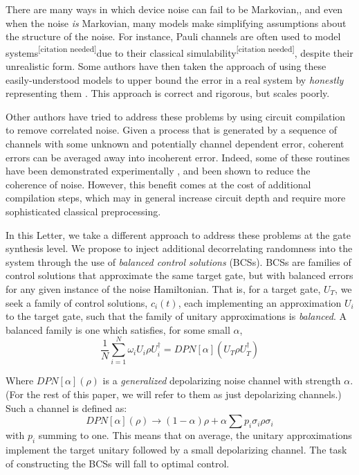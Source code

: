 \documentclass[aps,nofootinbib,pra,notitlepage,twocolumn]{revtex4-1}
\newcommand{\needcite}{{\color{blue}\textsuperscript{[citation needed]}}}
\begin{document}
There are many ways in which device noise can fail to be Markovian,\cite{Kelly2018, BlumeKohout2017}, and even when the noise \textit{is} Markovian, many models make simplifying assumptions about the structure of the noise. For instance, Pauli channels are often used to model systems\needcite due to their classical simulability\needcite, despite their unrealistic form. Some authors have then taken the approach of using these easily-understood models to upper bound the error in a real system by \textit{honestly} representing them \cite{Puzzuoli2014}. This approach is correct and rigorous, but scales poorly.

Other authors have tried to address these problems \cite{Wallman2016, Campbell2017, Heim2016} by using circuit compilation to remove correlated noise. Given a process that is generated by a sequence of channels with some unknown and potentially channel dependent error, coherent errors can be averaged away into incoherent error. Indeed, some of these routines have been demonstrated experimentally \cite{Ware2018}, and been shown to reduce the coherence of noise. However, this benefit comes at the cost of additional compilation steps, which may in general increase circuit depth and require more sophisticated classical preprocessing. 

In this Letter, we take a different approach to address these problems at the gate synthesis level. We propose to inject additional decorrelating randomness into the system through the use of \emph{balanced control solutions} (BCSs). BCSs are families of control solutions that approximate the same target gate, but with balanced errors for any given instance of the noise Hamiltonian. That is, for a target gate, $U_T$, we seek a family of control solutions, $c_i(t)$, each implementing an approximation $U_i$ to the target gate, such that the family of unitary approximations is \emph{balanced}. A balanced family is one which satisfies, for some small $\alpha$,
\begin{equation}\label{eq:1}
  \frac{1}{N}\sum_{i=1}^N \omega_i U_i \rho U_i^\dagger = DPN[\alpha]\left(U_T \rho U_T^\dagger \right)
\end{equation}

Where $DPN[\alpha](\rho)$ is a \textit{generalized} depolarizing noise channel with strength $\alpha$. (For the rest of this paper, we will refer to them as just depolarizing channels.) Such a channel is defined as:
\begin{equation}\label{eq:2}
  DPN[\alpha](\rho) \rightarrow (1-\alpha)\rho + \alpha\sum p_i \sigma_i\rho\sigma_i
\end{equation}
with $p_i$ summing to one. This means that on average, the unitary approximations implement the target unitary followed by a small depolarizing channel. The task of constructing the BCSs will fall to optimal control.
\end{document}
